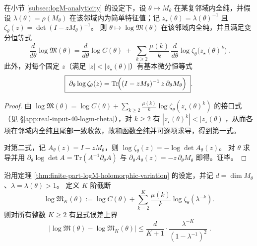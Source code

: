 \begin{theorem}\label{thm:finite-part-logM-holomorphic-variation}
在小节 \ref{subsec:logM-analyticity} 的设定下，设 \(\theta\mapsto M_\theta\) 在某复邻域内全纯，并假设 \(\lambda(\theta)=\rho(M_\theta)\) 在该邻域内为简单特征值；记 \(z_\star(\theta)=\lambda(\theta)^{-1}\) 且 \(\zeta_\theta(z)=\det(I-zM_\theta)^{-1}\)。
则 \(\theta\mapsto \log\mathfrak{M}(\theta)\) 在该邻域内全纯，并且满足变分恒等式
\[
\boxed{\;
\frac{d}{d\theta}\log\mathfrak{M}(\theta)
=\frac{d}{d\theta}\log C(\theta)
\;+\;
\sum_{k\ge 2}\frac{\mu(k)}{k}\,\frac{d}{d\theta}\log \zeta_\theta\!\bigl(z_\star(\theta)^k\bigr)\; }.
\]
此外，对每个固定 \(z\)（满足 \(|z|<|z_\star(\theta)|\)）有基本微分恒等式
\[
\boxed{\;
\partial_\theta \log \zeta_\theta(z)
=
\mathrm{Tr}\!\Bigl((I-zM_\theta)^{-1}\,z\,\partial_\theta M_\theta\Bigr)\; }.
\]
\end{theorem}

\begin{proof}
由 \(\log\mathfrak{M}(\theta)=\log C(\theta)+\sum_{k\ge 2}\frac{\mu(k)}{k}\log \zeta_\theta(z_\star(\theta)^k)\) 的接口式（见 \S\ref{app:real-input-40-logm-theta}），对 \(k\ge 2\) 有 \(|z_\star(\theta)^k|<|z_\star(\theta)|\)，从而各项在邻域内全纯且尾部一致收敛，故和函数全纯并可逐项求导，得到第一式。
\par
对第二式，记 \(A_\theta(z)=I-zM_\theta\)，则 \(\log\zeta_\theta(z)=-\log\det A_\theta(z)\)。
对 \(\theta\) 求导并用 \(\partial_\theta\log\det A=\mathrm{Tr}(A^{-1}\partial_\theta A)\) 与 \(\partial_\theta A_\theta(z)=-z\,\partial_\theta M_\theta\) 即得。证毕。
\end{proof}

\begin{theorem}\label{thm:finite-part-logM-truncation-explicit-bound}
沿用定理 \ref{thm:finite-part-logM-holomorphic-variation} 的设定，并记 \(d=\dim M_\theta\)、\(\lambda=\lambda(\theta)>1\)。
定义 \(K\) 阶截断
\[
\log\mathfrak{M}_K(\theta):=\log C(\theta)+\sum_{k=2}^{K}\frac{\mu(k)}{k}\log \zeta_\theta(\lambda^{-k}).
\]
则对所有整数 \(K\ge 2\) 有显式误差上界
\[
\boxed{\;
\bigl|\log\mathfrak{M}(\theta)-\log\mathfrak{M}_K(\theta)\bigr|
\le
\frac{d}{K+1}\cdot\frac{\lambda^{-K}}{(1-\lambda^{-1})^2}\; }.
\]
\end{theorem}

